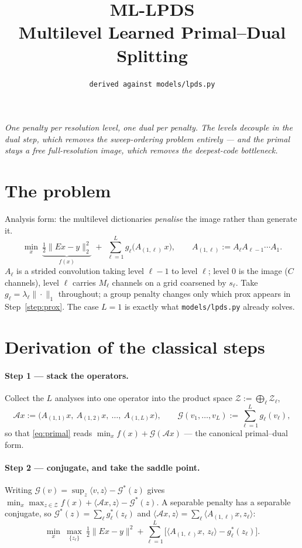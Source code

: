 \documentclass[11pt]{article}
\title{\textbf{ML-LPDS}\\[2pt]
       \large Multilevel Learned Primal--Dual Splitting}
\author{\texttt{derived against models/lpds.py}}
\date{}
\newcommand{\bA}{\mathcal{A}}
\newcommand{\bZ}{\mathcal{Z}}
\newcommand{\bG}{\mathcal{G}}
\newcommand{\Aell}{A_{(1,\ell)}}
\begin{document}
\maketitle
\vspace{-2.2em}

\noindent\textit{One penalty per resolution level, one dual per penalty. The levels decouple in the dual
step, which removes the sweep-ordering problem entirely --- and the primal stays a free full-resolution
image, which removes the deepest-code bottleneck.}

\section{The problem}

Analysis form: the multilevel dictionaries \emph{penalise} the image rather than generate it.
\begin{equation}\label{eq:primal}
  \min_{x}\ \underbrace{\tfrac12\big\|Ex-y\big\|_2^2}_{f(x)}
  \;+\; \sum_{\ell=1}^{L} g_\ell\!\big(\Aell\,x\big),
  \qquad \Aell := A_\ell A_{\ell-1}\cdots A_1 .
\end{equation}
$A_\ell$ is a strided convolution taking level $\ell-1$ to level $\ell$; level 0 is the image ($C$
channels), level $\ell$ carries $M_\ell$ channels on a grid coarsened by $s_\ell$. Take
$g_\ell = \lambda_\ell\|\cdot\|_1$ throughout; a group penalty changes only which prox appears in
Step~\ref{step:prox}. The case $L=1$ is exactly what \texttt{models/lpds.py} already solves.

\section{Derivation of the classical steps}

\paragraph{Step 1 --- stack the operators.}
Collect the $L$ analyses into one operator into the product space $\bZ := \bigoplus_\ell \bZ_\ell$,
\[
  \bA x := \big(A_{(1,1)}x,\ A_{(1,2)}x,\ \dots,\ A_{(1,L)}x\big),
  \qquad
  \bG(v_1,\dots,v_L) := \sum_{\ell=1}^{L} g_\ell(v_\ell),
\]
so that \eqref{eq:primal} reads $\min_x f(x) + \bG(\bA x)$ --- the canonical primal--dual form.

\paragraph{Step 2 --- conjugate, and take the saddle point.}
Writing $\bG(v) = \sup_z \langle v,z\rangle - \bG^*(z)$ gives
$\min_x \max_{z\in\bZ} f(x) + \langle \bA x, z\rangle - \bG^*(z)$. A separable penalty has a separable
conjugate, so $\bG^*(z) = \sum_\ell g_\ell^*(z_\ell)$ and
$\langle \bA x, z\rangle = \sum_\ell \langle \Aell x, z_\ell\rangle$:
\begin{equation}\label{eq:saddle}
  \min_{x}\ \max_{\{z_\ell\}}\ \tfrac12\|Ex-y\|^2
  + \sum_{\ell=1}^{L}\Big[\big\langle \Aell x,\, z_\ell\big\rangle - g_\ell^*(z_\ell)\Big].
\end{equation}
\end{document}
